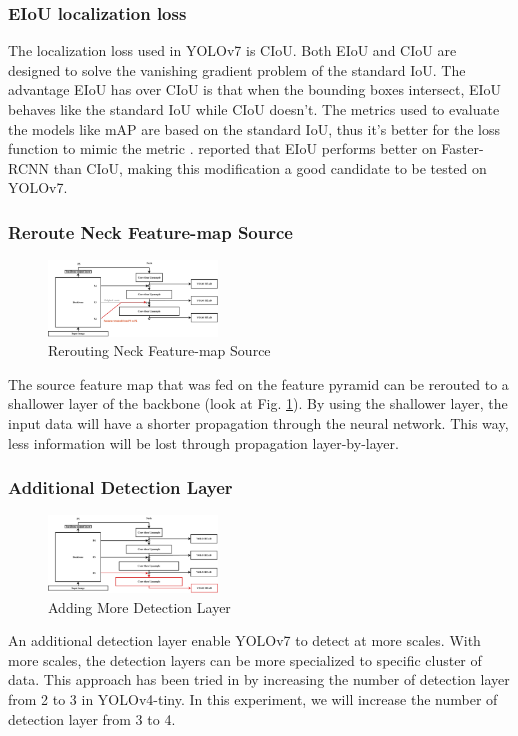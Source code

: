 \documentclass[conference]{IEEEtran}
\begin{document}
\subsubsection{EIoU localization loss}
The localization loss used in YOLOv7 is CIoU.
Both EIoU and CIoU are designed to solve the vanishing gradient problem of the standard
IoU. The advantage EIoU has over CIoU is that when the bounding boxes intersect, EIoU
behaves like the standard IoU while CIoU doesn't. The metrics used to evaluate the models
like mAP are based on the standard IoU, thus it's better for the loss function to mimic the metric \cite{eiou}.
\cite{eiou} reported that EIoU performs better on Faster-RCNN than CIoU, making this modification
a good candidate to be tested on YOLOv7.

\subsubsection{Reroute Neck Feature-map Source}
\begin{figure}[htbp]
\centerline{\includegraphics[width=0.4\textwidth]{../book/figures/neck-move-back.pdf}}
\caption{Rerouting Neck Feature-map Source}
\label{fig:neck-move-back}
\end{figure}
The source feature map that was fed on the feature pyramid can be rerouted 
to a shallower layer of the backbone (look at Fig. \ref{fig:neck-move-back}). 
By using the shallower layer, the input data will have a shorter propagation through the neural network.
This way, less information will be lost through propagation layer-by-layer.

\subsubsection{Additional Detection Layer}
\begin{figure}[htbp]
\centerline{\includegraphics[width=0.4\textwidth]{../book/figures/addmorehead.pdf}}
\caption{Adding More Detection Layer}
\label{fig:add-head}
\end{figure}
An additional detection layer enable YOLOv7 to detect at more scales. With more scales,
the detection layers can be more specialized to specific cluster of data.
This approach has been tried in \cite{barunastra} by increasing the number of
detection layer from 2 to 3 in YOLOv4-tiny. In this experiment, we will increase
the number of detection layer from 3 to 4.
\end{document}
